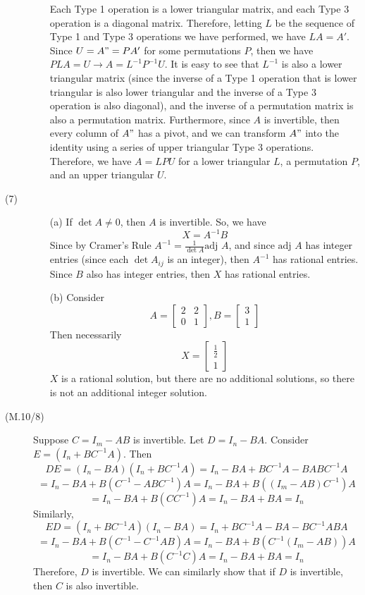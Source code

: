 \begin{description}
\begin{itemize}
Each Type 1 operation is a lower triangular matrix, and each Type 3 operation is a diagonal matrix. Therefore, letting $L$ be the sequence of Type 1 and Type 3 operations we have performed, we have $LA = A'$. Since $U = A" = PA'$ for some permutations $P$, then we have $PLA = U \rightarrow A = L^{-1}P^{-1}U$. It is easy to see that $L^{-1}$ is also a lower triangular matrix (since the inverse of a Type 1 operation that is lower triangular is also lower triangular and the inverse of a Type 3 operation is also diagonal), and the inverse of a permutation matrix is also a permutation matrix. Furthermore, since $A$ is invertible, then every column of $A"$ has a pivot, and we can transform $A"$ into the identity using a series of upper triangular Type 3 operations. Therefore, we have $A = LPU$ for a lower triangular $L$, a permutation $P$, and an upper triangular $U$.
\end{itemize}
\item[(7)]
\begin{itemize}
\item[(a)]
If $\det A \neq 0$, then $A$ is invertible. So, we have
$$X = A^{-1}B$$
Since by Cramer's Rule $A^{-1} = \frac{1}{\det A}\text{adj }A$, and since $\text{adj }A$ has integer entries (since each $\det A_{ij}$ is an integer), then $A^{-1}$ has rational entries. Since $B$ also has integer entries, then $X$ has rational entries.
\item[(b)]
Consider
$$A = \begin{bmatrix}
2 & 2 \\
0 & 1
\end{bmatrix}, B = \begin{bmatrix}
3 \\
1
\end{bmatrix}$$
Then necessarily
$$X = \begin{bmatrix}
\frac{1}{2} \\
1
\end{bmatrix}$$
$X$ is a rational solution, but there are no additional solutions, so there is not an additional integer solution.
\end{itemize}
\item[(M.10/8)]
Suppose $C = I_m - AB$ is invertible. Let $D = I_n - BA$. Consider $E = (I_n + BC^{-1}A)$. Then
$$DE = (I_n - BA)(I_n + BC^{-1}A) = I_n - BA + BC^{-1}A - BABC^{-1}A$$
$$= I_n - BA + B(C^{-1} - ABC^{-1})A = I_n - BA + B((I_m - AB)C^{-1})A$$
$$= I_n - BA + B(CC^{-1})A = I_n - BA + BA = I_n$$
Similarly,
$$ED = (I_n + BC^{-1}A)(I_n - BA) = I_n + BC^{-1}A - BA - BC^{-1}ABA$$
$$= I_n - BA + B(C^{-1} - C^{-1}AB)A = I_n - BA + B(C^{-1}(I_m - AB))A$$
$$= I_n - BA + B(C^{-1}C)A = I_n - BA + BA = I_n$$
Therefore, $D$ is invertible. We can similarly show that if $D$ is invertible, then $C$ is also invertible.
\end{description}